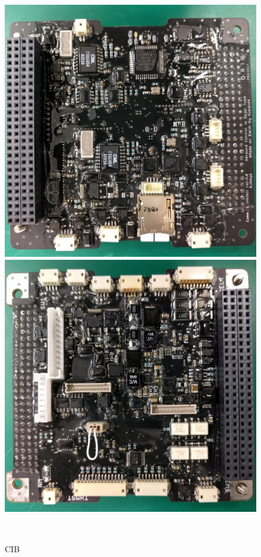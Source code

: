 \begin{figure}[htbp]
	\begin{minipage}{0.5\hsize}
		\begin{center}
			\includegraphics[width=0.7
			\linewidth]{./03/fig/CIB_1.jpg}
		\end{center}
	\end{minipage}
	\begin{minipage}{0.5\hsize}
		\begin{center}
			\includegraphics[width=0.7\linewidth]{./03/fig/CIB_2.jpg}
		\end{center}
	\end{minipage}\\		
	\begin{center}
		\caption{CIB}
	\end{center}
\label{CIB}
\end{figure}

